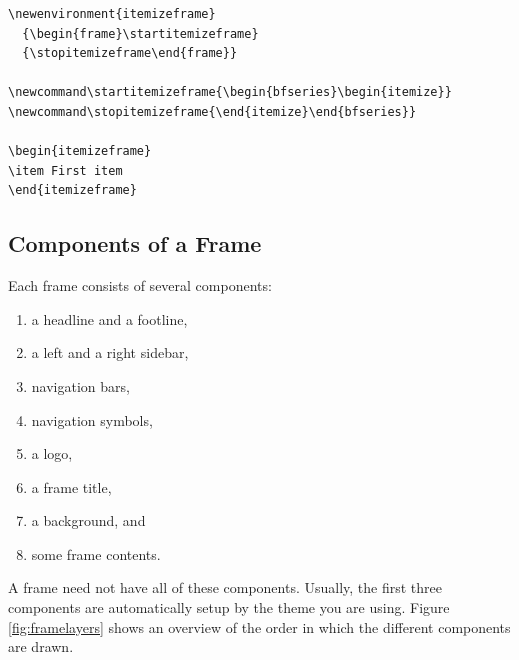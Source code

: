 \begin{verbatim}
\newenvironment{itemizeframe}
  {\begin{frame}\startitemizeframe}
  {\stopitemizeframe\end{frame}}

\newcommand\startitemizeframe{\begin{bfseries}\begin{itemize}}
\newcommand\stopitemizeframe{\end{itemize}\end{bfseries}}

\begin{itemizeframe}
\item First item
\end{itemizeframe}
\end{verbatim}


\subsection{Components of a Frame}

Each frame consists of several components:
\begin{enumerate}\itemsep=0pt\parskip=0pt
\item a headline and a footline,
\item a left and a right sidebar,
\item navigation bars,
\item navigation symbols,
\item a logo,
\item a frame title,
\item a background, and
\item some frame contents.
\end{enumerate}

A frame need not have all of these components. Usually, the first three components are automatically setup by the theme you are using. 
Figure \ref{fig:framelayers} shows an overview of the order in which the different components are drawn.

